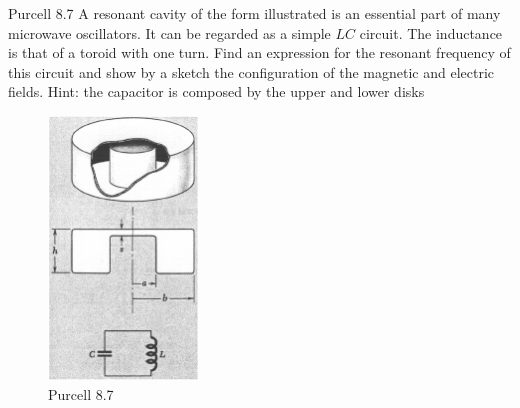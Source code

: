 \documentclass[makesolutionspdf]{esg8022pset}
\begin{document}
\begin{problem}{Purcell 8.7}
  A resonant cavity of the form illustrated is an essential part of many microwave oscillators. It can be regarded as a simple $LC$ circuit. The inductance is that of a toroid with one turn. Find an expression for the resonant frequency of this circuit and show by a sketch the configuration of the magnetic and electric fields.
  Hint: the capacitor is composed by the upper and lower disks
  \begin{figure}[H]
    \centering
    \includegraphics[width = 4cm]{pu807}
    \caption{Purcell 8.7}
    \label{fig:cavity2}
  \end{figure}
\end{problem}
\end{document}

